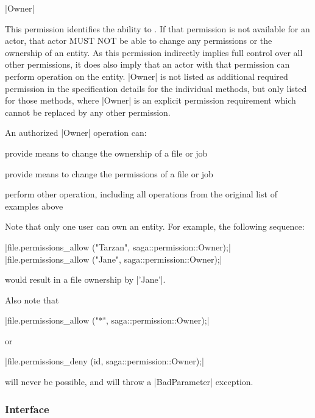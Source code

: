 \begin{list}{}{}
 
  \item{\sunshift|Owner|}
 
  This permission identifies the ability to .  If that permission
  is not available for an actor, that actor MUST NOT be able to
  change any permissions or the ownership of an entity.  As this
  permission indirectly implies full control over all other
  permissions, it does also imply that an actor with that
  permission can perform  operation on the entity.
  |Owner| is not listed as additional required permission in the
  specification details for the individual methods, but only
  listed for those methods, where |Owner| is an explicit
  permission requirement which cannot be replaced by any other
  permission.
 
  An authorized |Owner| operation can:
 
  \begin{shortlist}
   \item provide means to change the ownership of a file or job
   \item provide means to change the permissions of a file or job
   \item perform  other operation, including all
         operations from the original list of examples above
  \end{shortlist}
 
  Note that only one user can own an entity.  For example, the
  following sequence:
 
   \shift |file.permissions_allow ("Tarzan", saga::permission::Owner);|
   \shift |file.permissions_allow ("Jane",   saga::permission::Owner);|
 
  would result in a file ownership by |'Jane'|.  
 
  Also note that 
 
   \shift |file.permissions_allow ("*", saga::permission::Owner);|
 
  or 
 
   \shift |file.permissions_deny (id, saga::permission::Owner);|
 
  will never be possible, and will throw a |BadParameter|
  exception.
 
 \end{list}
 
 
 \subsubsection*{Interface }
 
